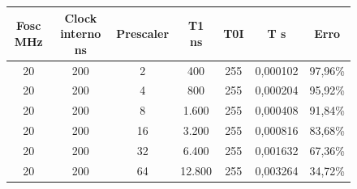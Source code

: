 \documentclass{article}
\begin{document}
\begin{figure}[H]
\centering

\begin{tabular}{|c|c|c|c|c|c|c|}
\hline
\rowcolor[HTML]{FFD966} 
\cellcolor[HTML]{FFD966}\textbf{Fosc MHz} & \cellcolor[HTML]{FFD966}\textbf{Clock interno ns} & \cellcolor[HTML]{FFD966}\textbf{Prescaler} & \cellcolor[HTML]{FFD966}\textbf{T1 ns} & \cellcolor[HTML]{FFD966}\textbf{T0I} & \cellcolor[HTML]{FFD966}\textbf{T s} & \cellcolor[HTML]{FFD966}\textbf{Erro} \\ \hline
\rowcolor[HTML]{FFFFFF} 
20                                                          & 200                                                                & 2                   & 400                                                       & 255          & 0,000102                                               & 97,96\%       \\ \hline
\rowcolor[HTML]{FFFFFF} 
20                                                          & 200                                                                & 4                   & 800                                                       & 255          & 0,000204                                               & 95,92\%       \\ \hline
\rowcolor[HTML]{FFFFFF} 
20                                                          & 200                                                                & 8                   & 1.600                                                     & 255          & 0,000408                                               & 91,84\%       \\ \hline
\rowcolor[HTML]{FFFFFF} 
20                                                          & 200                                                                & 16                  & 3.200                                                     & 255          & 0,000816                                               & 83,68\%       \\ \hline
\rowcolor[HTML]{FFFFFF} 
20                                                          & 200                                                                & 32                  & 6.400                                                     & 255          & 0,001632                                               & 67,36\%       \\ \hline
\rowcolor[HTML]{FFFFFF} 
20                                                          & 200                                                                & 64                  & 12.800                                                    & 255          & 0,003264                                               & 34,72\%       \\ \hline

\end{tabular}
\end{figure}
\end{document}
